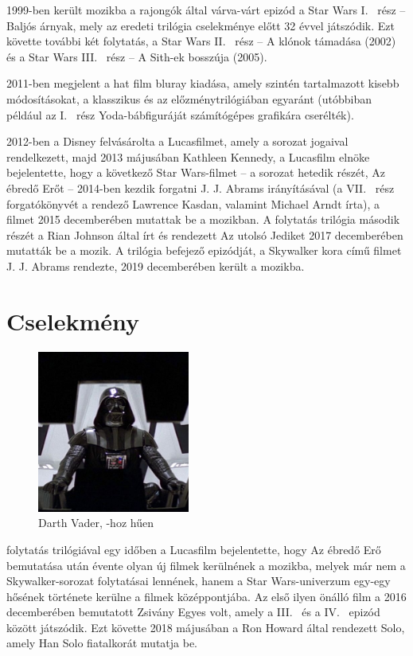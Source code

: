 \documentclass[a4paper,12pt,twoside]{report}
\theoremstyle{definition}
\begin{document}
	1999-ben került mozikba a rajongók által várva-várt epizód a Star Wars I.~ rész -- Baljós árnyak, mely az eredeti trilógia cselekménye előtt 32 évvel játszódik. Ezt követte további két folytatás, a Star Wars II.~ rész -- A klónok támadása (2002) és a Star Wars III.~ rész -- A Sith-ek bosszúja (2005).
	
	2011-ben megjelent a hat film bluray kiadása, amely szintén tartalmazott kisebb módosításokat, a klasszikus és az előzménytrilógiában egyaránt (utóbbiban például az I.~ rész Yoda-bábfiguráját számítógépes grafikára cserélték).
	
	2012-ben a Disney felvásárolta a Lucasfilmet, amely a sorozat jogaival rendelkezett, majd 2013 májusában Kathleen Kennedy, a Lucasfilm elnöke bejelentette, hogy a következő Star Wars-filmet -- a sorozat hetedik részét, Az ébredő Erőt -- 2014-ben kezdik forgatni J. J. Abrams irányításával (a VII.~ rész forgatókönyvét a rendező Lawrence Kasdan, valamint Michael Arndt írta), a filmet 2015 decemberében mutattak be a mozikban. A folytatás trilógia második részét a Rian Johnson által írt és rendezett Az utolsó Jediket 2017 decemberében mutatták be a mozik. A trilógia befejező epizódját, a Skywalker kora című filmet J. J. Abrams rendezte, 2019 decemberében került a mozikba.
	\section{Cselekmény}
	\begin{figure}	
		\centering
		\includegraphics[width=5cm]{dv}
		\caption{Darth Vader, -hoz hűen}
		\label{fig-dw}
	\end{figure}
\Az folytatás trilógiával egy időben a Lucasfilm bejelentette, hogy Az ébredő Erő bemutatása után évente olyan új filmek kerülnének a mozikba, melyek már nem a Skywalker-sorozat folytatásai lennének, hanem a Star Wars-univerzum egy-egy hősének története kerülne a filmek középpontjába. Az első ilyen önálló film a 2016 decemberében bemutatott Zsivány Egyes volt, amely a III.~ és a IV.~ epizód között játszódik. Ezt követte 2018 májusában a Ron Howard által rendezett Solo, amely Han Solo fiatalkorát mutatja be. 	
	
\end{document}
